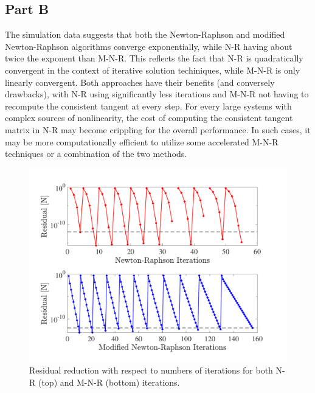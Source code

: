 \subsection*{Part B}
The simulation data suggests that both the Newton-Raphson and modified Newton-Raphson algorithms converge exponentially, while N-R having about twice the exponent than M-N-R.
This reflects the fact that N-R is quadratically convergent in the context of iterative solution techiniques, while M-N-R is only linearly convergent. 
Both approaches have their benefits (and conversely drawbacks), with N-R using significantly less iterations and M-N-R not having to recompute the consistent tangent at every step. 
For every large systems with complex sources of nonlinearity, the cost of computing the consistent tangent matrix in N-R may become crippling for the overall performance. 
In such cases, it may be more computationally efficient to utilize some accelerated M-N-R techniques or a combination of the two methods. 

\begin{figure}[!ht]
    \centering
    \includegraphics[width=\linewidth]{homework/hw1/hw1_p4_res.pdf}
    \caption{Residual reduction with respect to numbers of iterations for both N-R (top) and M-N-R (bottom) iterations.  
    }
    \label{fig:hw1_p4_res}
\end{figure}

